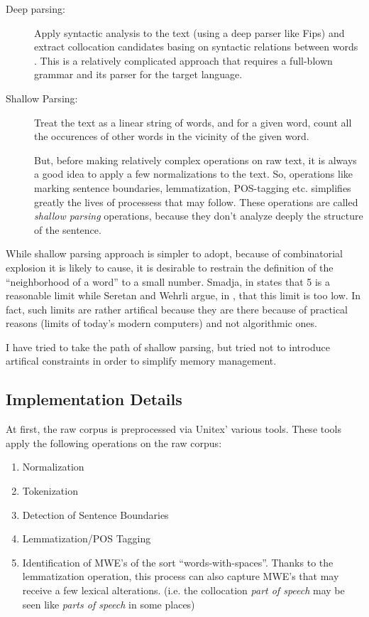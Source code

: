 \documentclass[a4paper,12pt,oneside]{article}
\begin{document}
\begin{description}
\item[Deep parsing:] Apply syntactic analysis to the text (using a deep parser like Fips\cite{fips2007}) and extract collocation candidates basing on syntactic relations between words \cite{SeretanWehrli2006ACL}. This is a relatively complicated approach that requires a full-blown grammar and its parser for the target language.

\item[Shallow Parsing:] Treat the text as a linear string of words, and for a given word, count all the occurences of other words in the vicinity of the given word. 

But, before making relatively complex operations on raw text, it is always a good idea to apply a few normalizations to the text. So, operations like marking sentence boundaries, lemmatization, POS-tagging etc. simplifies greatly the lives of processess that may follow\cite{smadja93}. These operations are called \emph{shallow parsing} operations, because they don't analyze deeply the structure of the sentence.

\end{description}

While shallow parsing approach is simpler to adopt, because of combinatorial explosion it is likely to cause, it is desirable to restrain the definition of the ``neighborhood of a word'' to a small number. Smadja, in \cite{smadja93} states that 5 is a reasonable limit while Seretan and Wehrli argue, in \cite{SeretanWehrli2006ACL}, that this limit is too low. In fact, such limits are rather artifical because they are there because of practical reasons (limits of today's modern computers) and not algorithmic ones.

I have tried to take the path of shallow parsing, but tried not to introduce artifical constraints in order to simplify memory management.

\subsection{Implementation Details}
At first, the raw corpus is preprocessed via Unitex' various tools. These tools apply the following operations on the raw corpus:
\begin{enumerate}
\item Normalization
\item Tokenization
\item Detection of Sentence Boundaries
\item Lemmatization/POS Tagging
\item Identification of MWE's of the sort ``words-with-spaces''. Thanks to the lemmatization operation, this process can also capture MWE's that may receive a few lexical alterations. (i.e. the collocation \emph{part of speech} may be seen like \emph{parts of speech} in some places)
\end{enumerate}
\end{document}
